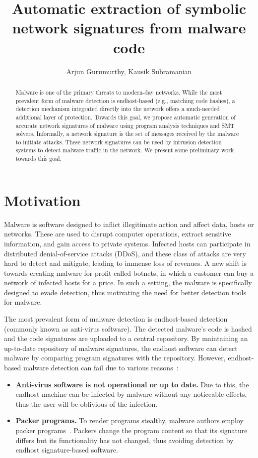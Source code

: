 \documentclass[twocolumn, 11pt]{paper}
\title{Automatic extraction of symbolic network signatures from malware code}
\author{Arjun Gurumurthy, Kausik Subramanian}
\begin{document}
\maketitle

\begin{abstract}
Malware is one of the primary threats to modern-day networks. While the most prevalent form of malware detection is endhost-based (e.g., matching code hashes), a detection mechanism integrated directly into the network offers a much-needed additional layer of protection. Towards this goal, we propose automatic generation of accurate network signatures of malware  using program analysis techniques and SMT solvers. Informally, a network signature is the set of messages received by the malware to initiate attacks. These network signatures can be used by intrusion detection systems to detect malware traffic in the network. We present some preliminary work towards this goal. 
\end{abstract}

\section{Motivation}
Malware is software designed to inflict illegitimate action and affect data, hosts or networks. These are used to 
disrupt computer operations, extract sensitive information, and 
gain access to private systems. Infected hosts can participate 
in distributed denial-of-service attacks (DDoS), and these class of 
attacks are very hard to detect and mitigate, leading to immense
loss of revenues. A new shift is towards creating malware for 
profit called botnets, in which a customer can buy a network of
infected hosts for a price. In such a setting, the malware is
specifically designed to evade detection, thus motivating the need
for better detection tools for malware. 

The most prevalent form of malware detection is endhost-based detection
(commonly known as anti-virus software). The detected malware's code is hashed and the code signatures are uploaded to a central repository. By maintaining an up-to-date repository of malware signatures, the endhost software can detect malware by comparing program signatures with the repository. However, endhost-based malware detection can fail due to various reasons~\cite{networksig}:
\begin{itemize}
	\item \textbf{Anti-virus software is not operational or up to date.} 
	Due to this, the endhost machine can be infected by malware without any
	noticeable effects, thus the user will be oblivious of the infection.
	\item \textbf{Packer programs.} To render programs stealthy, malware authors
	employ packer programs~\cite{packer}. Packers change the program content so that
	its signature differs but its functionality has not changed, thus avoiding
	detection by endhost signature-based software.
\end{itemize}
\end{document}
